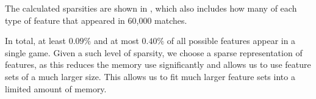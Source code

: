 \begin{table}[!htb]
  \centering
  \caption{The sparsity of each type of feature. (*)At most.}\label{tab:featuresparsity}
\end{table}

The calculated sparsities are shown in , which also includes how many of each type of feature that appeared in 60,000 matches.

In total, at least $0.09 \%$ and at most $0.40\%$ of all possible features appear in a single game. Given a such level of sparsity, we choose a sparse representation of features, as this reduces the memory use significantly and allows us to use feature sets of a much larger size. This allows us to fit much larger feature sets into a limited amount of memory.